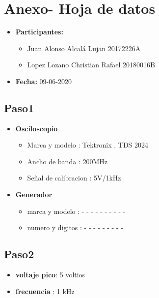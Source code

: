\documentclass[a4paper,12pt]{article}
\begin{document}
\section*{Anexo- Hoja de datos}

\begin{itemize}

\item \textbf{Participantes:} 
\begin{itemize}
\item Juan Alonso Alcalá Lujan 20172226A
\item Lopez Lozano Christian Rafael 20180016B
\end{itemize} 
\item \textbf{Fecha:} 09-06-2020

\end{itemize}


\subsection*{Paso1}

\begin{itemize}

\item \textbf{Osciloscopio} 
\begin{itemize}

\item Marca y modelo : Tektronix , TDS 2024
\item Ancho de banda :  200MHz 
\item Señal de calibracion : 5V/1kHz

\end{itemize}


\item \textbf{Generador} 

\begin{itemize}
\item marca y modelo : - - - - - - - - - -
\item numero y digitos : - - - - - - - - -

\end{itemize}

\end{itemize}



\subsection*{Paso2}


\begin{itemize}
\item \textbf{voltaje pico}: 5 voltios 
\item \textbf{frecuencia} : 1 kHz 
\end{itemize}
\end{document}

